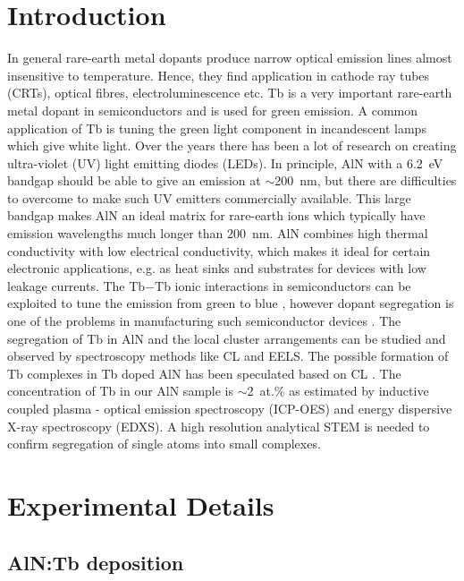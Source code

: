 \documentclass[%
aip,
rsi,%
 amsmath,amssymb,%
 reprint,%
]{revtex4-1}
\begin{document}
\section{Introduction}
\label{sec:Intro}

In general rare-earth metal dopants\cite{Kenyon2003,Kenyon2002} produce narrow optical emission lines almost insensitive to temperature. Hence, they find application in cathode ray tubes (CRTs), optical fibres, electroluminescence etc\cite{Aitasalo2003}. Tb is a very important rare-earth metal dopant in semiconductors and is used for green emission. A common application of Tb is tuning the green light component in incandescent lamps which give white light. Over the years there has been a lot of research on creating ultra-violet (UV) light emitting diodes (LEDs). In principle, AlN with a 6.2~eV bandgap should be able to give an emission at $\sim$200~nm, but there are difficulties to overcome to make such UV emitters commercially available. This large bandgap makes AlN an ideal matrix for rare-earth ions which typically have emission wavelengths much longer than 200~nm. AlN combines high thermal conductivity with low electrical conductivity, which makes it ideal for certain electronic applications, e.g. as heat sinks and substrates for devices with low leakage currents. The Tb$-$Tb ionic interactions in semiconductors can be exploited to tune the emission from green to blue \cite{Benz2013}, however dopant segregation is one of the problems in manufacturing such semiconductor devices \cite{Keizer2015}. The segregation of Tb in AlN and the local cluster arrangements can be studied and observed by spectroscopy methods like CL and EELS. The possible formation of Tb complexes in Tb doped AlN has been speculated based on CL \cite{Benz2013_AlNTb}. The concentration of Tb in our AlN sample is $\sim$2~at.\% as estimated by inductive coupled plasma - optical emission spectroscopy (ICP-OES) and energy dispersive X-ray spectroscopy (EDXS). A high resolution analytical STEM is needed to confirm segregation of single atoms into small complexes.

\section{Experimental Details}
\label{sec:exp_detail}

\subsection{AlN:Tb deposition}
\label{sec:growth}
\end{document}
